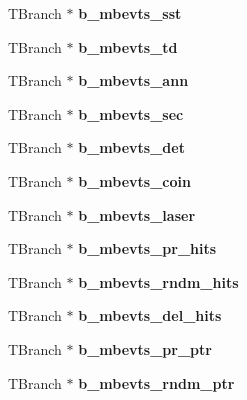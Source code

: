 \begin{DoxyCompactItemize}
T\+Branch $\ast$ {\bfseries b\+\_\+mbevts\+\_\+sst}
\item 
\mbox{\label{classg__clx_a9b39386d9c1a2e6536fa62a70d2d169f}} 
T\+Branch $\ast$ {\bfseries b\+\_\+mbevts\+\_\+td}
\item 
\mbox{\label{classg__clx_ac6b131947020f22150d9562d519bce3f}} 
T\+Branch $\ast$ {\bfseries b\+\_\+mbevts\+\_\+ann}
\item 
\mbox{\label{classg__clx_a626c3570226a2cf9bdb2b523f1422286}} 
T\+Branch $\ast$ {\bfseries b\+\_\+mbevts\+\_\+sec}
\item 
\mbox{\label{classg__clx_a682289b20e95b369adcdf382225884a2}} 
T\+Branch $\ast$ {\bfseries b\+\_\+mbevts\+\_\+det}
\item 
\mbox{\label{classg__clx_a6f09892a8e1906c10e7f2575d41641bf}} 
T\+Branch $\ast$ {\bfseries b\+\_\+mbevts\+\_\+coin}
\item 
\mbox{\label{classg__clx_a34c3cf461751e39034565bfb9dad5a7d}} 
T\+Branch $\ast$ {\bfseries b\+\_\+mbevts\+\_\+laser}
\item 
\mbox{\label{classg__clx_a65da8db31fa55fae0873a2e67a862bf7}} 
T\+Branch $\ast$ {\bfseries b\+\_\+mbevts\+\_\+pr\+\_\+hits}
\item 
\mbox{\label{classg__clx_a4c476be1f0e3227fce3ad74f91224929}} 
T\+Branch $\ast$ {\bfseries b\+\_\+mbevts\+\_\+rndm\+\_\+hits}
\item 
\mbox{\label{classg__clx_af8844a7d126f13b0932cf3d3ecce107b}} 
T\+Branch $\ast$ {\bfseries b\+\_\+mbevts\+\_\+del\+\_\+hits}
\item 
\mbox{\label{classg__clx_a249297b5ba9a24c75c59f6055e9fe061}} 
T\+Branch $\ast$ {\bfseries b\+\_\+mbevts\+\_\+pr\+\_\+ptr}
\item 
\mbox{\label{classg__clx_a7401209db4725c74c75d38e15a6b2d11}} 
T\+Branch $\ast$ {\bfseries b\+\_\+mbevts\+\_\+rndm\+\_\+ptr}
\item 
\mbox{\label{classg__clx_abb8b9787037a50733cc8f2efb64fadba}} 

\end{DoxyCompactItemize}
